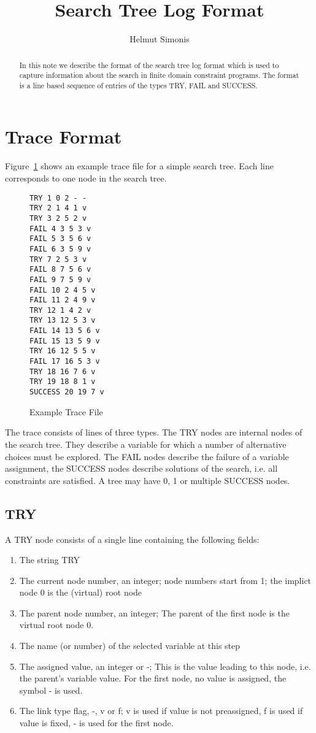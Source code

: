 \documentclass[a4paper]{article}
\begin{document}
\author{Helmut Simonis}
\title{Search Tree Log Format}
\maketitle
\begin{abstract}
In this note we describe the format of the search tree log format which is used to capture information about the search in finite domain constraint programs. The format is a line based sequence of entries of the types TRY, FAIL and SUCCESS.
\end{abstract}

\section{Trace Format}
Figure~\ref{Example Trace File} shows an example trace file for a simple search tree. Each line corresponds to one node in the search tree.
\begin{figure}[htb]
\begin{verbatim}
TRY 1 0 2 - -
TRY 2 1 4 1 v
TRY 3 2 5 2 v
FAIL 4 3 5 3 v
FAIL 5 3 5 6 v
FAIL 6 3 5 9 v
TRY 7 2 5 3 v
FAIL 8 7 5 6 v
FAIL 9 7 5 9 v
FAIL 10 2 4 5 v
FAIL 11 2 4 9 v
TRY 12 1 4 2 v
TRY 13 12 5 3 v
FAIL 14 13 5 6 v
FAIL 15 13 5 9 v
TRY 16 12 5 5 v
FAIL 17 16 5 3 v
TRY 18 16 7 6 v
TRY 19 18 8 1 v
SUCCESS 20 19 7 v
\end{verbatim}
\caption{\label{Example Trace File}Example Trace File}
\end{figure}
The trace consists of lines of three types. The TRY nodes are internal nodes of the search tree. They describe a variable for which a number of alternative choices must be explored. The FAIL nodes describe the failure of a variable assignment, the SUCCESS nodes describe solutions of the search, i.e. all constraints are satisfied. A tree may have 0, 1 or multiple SUCCESS nodes. 

\subsection{TRY}

A TRY node consists of a single line containing the following fields:

\begin{enumerate}
\item The string TRY
\item The current node number, an integer; node numbers start from 1; the implict node 0 is the (virtual) root node
\item The parent node number, an integer; The parent of the first node is the virtual root node 0.
\item The name (or number) of the selected variable at this step 
\item The assigned value, an integer or -; This is the value leading to this node, i.e. the parent's variable value. For the first node, no value is assigned, the symbol - is used.
\item The link type flag, -, v or f; v is used if value is not preassigned, f is used if value is fixed, - is used for the first node. 
\end{enumerate}
\end{document}
